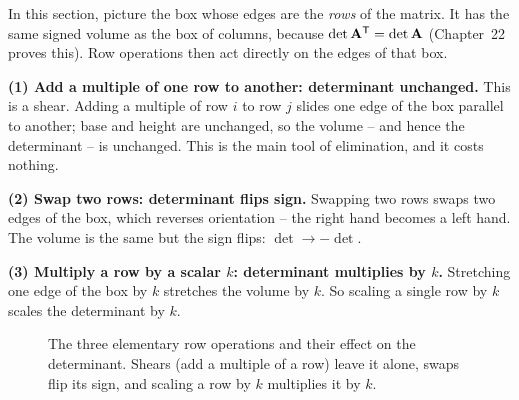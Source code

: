 In this section, picture the box whose edges are the \emph{rows} of the matrix.
It has the same signed volume as the box of columns, because
$\det\mathbf{A}^{\mathsf{T}} = \det\mathbf{A}$ (Chapter~22 proves this). Row operations then act
directly on the edges of that box.

\textbf{(1) Add a multiple of one row to another: determinant unchanged.}
This is a shear. Adding a multiple of row $i$ to row $j$ slides one edge of the box parallel to
another; base and height are unchanged, so the volume -- and hence the
determinant -- is unchanged. This is the main tool of elimination, and it costs nothing.

\textbf{(2) Swap two rows: determinant flips sign.}
Swapping two rows swaps two edges of the box, which reverses orientation -- the
right hand becomes a left hand. The volume is the same but the sign flips:
$\det \to -\det$.

\textbf{(3) Multiply a row by a scalar $k$: determinant multiplies by $k$.}
Stretching one edge of the box by $k$ stretches the volume by $k$. So scaling a
single row by $k$ scales the determinant by $k$.

\begin{figure}[H]
\centering
{}
\caption{The three elementary row operations and their effect on the determinant.
Shears (add a multiple of a row) leave it alone, swaps flip its sign, and scaling a
row by $k$ multiplies it by $k$.}
\label{ch21:fig-rowops}
\end{figure}

